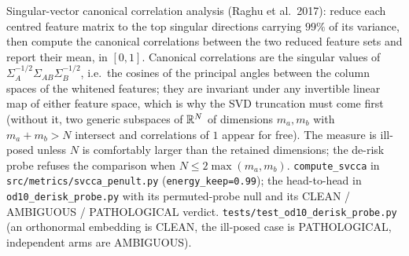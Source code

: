 {Singular-vector canonical correlation analysis (Raghu et al.\ 2017): reduce each centred feature matrix to the top singular directions carrying $99\%$ of its variance, then compute the canonical correlations between the two reduced feature sets and report their mean, in $[0,1]$.}
{Canonical correlations are the singular values of $\Sigma_A^{-1/2}\Sigma_{AB}\Sigma_B^{-1/2}$, i.e.\ the cosines of the principal angles between the column spaces of the whitened features; they are invariant under any invertible linear map of either feature space, which is why the SVD truncation must come first (without it, two generic subspaces of $\mathbb{R}^N$ of dimensions $m_a,m_b$ with $m_a+m_b>N$ intersect and correlations of $1$ appear for free). The measure is ill-posed unless $N$ is comfortably larger than the retained dimensions; the de-risk probe refuses the comparison when $N\le2\max(m_a,m_b)$.}
{\texttt{compute\_svcca} in \texttt{src/metrics/svcca\_penult.py} (\texttt{energy\_keep=0.99}); the head-to-head in \texttt{od10\_derisk\_probe.py} with its permuted-probe null and its CLEAN / AMBIGUOUS / PATHOLOGICAL verdict.}
{\texttt{tests/test\_od10\_derisk\_probe.py} (an orthonormal embedding is CLEAN, the ill-posed case is PATHOLOGICAL, independent arms are AMBIGUOUS).}
